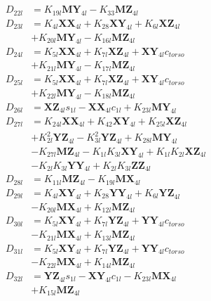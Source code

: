 \begin{align}
 \nonumber \\ 
D_{22l} &= K_{19l}\mathbf{MY}_{4l} - K_{33}\mathbf{MZ}_{4l} \nonumber \\
D_{23l} &= K_{4l}\mathbf{XX}_{4l} + K_{28}\mathbf{XY}_{4l} + K_{6l}\mathbf{XZ}_{4l}  \nonumber \\
&+ K_{20l}\mathbf{MY}_{4l} - K_{16l}\mathbf{MZ}_{4l} \nonumber \\
D_{24l} &= K_{5l}\mathbf{XX}_{4l} + K_{7l}\mathbf{XZ}_{4l} + \mathbf{XY}_{4l}c_{torso}  \nonumber \\
&+ K_{21l}\mathbf{MY}_{4l} - K_{17l}\mathbf{MZ}_{4l} \nonumber \\
D_{25l} &= K_{5l}\mathbf{XX}_{4l} + K_{7l}\mathbf{XZ}_{4l} + \mathbf{XY}_{4l}c_{torso}  \nonumber \\
&+ K_{22l}\mathbf{MY}_{4l} - K_{18l}\mathbf{MZ}_{4l} \nonumber \\
D_{26l} &= \mathbf{XZ}_{4l}s_{1l} - \mathbf{XX}_{4l}c_{1l} + K_{23l}\mathbf{MY}_{4l} \nonumber \\
D_{27l} &= K_{24l}\mathbf{XX}_{4l} + K_{42}\mathbf{XY}_{4l} + K_{25l}\mathbf{XZ}_{4l}  \nonumber \\
&+ K_{2l}^2\mathbf{YZ}_{4l} - K_{3l}^2\mathbf{YZ}_{4l} + K_{28l}\mathbf{MY}_{4l}  \nonumber \\
&- K_{27l}\mathbf{MZ}_{4l} - K_{1l}K_{3l}\mathbf{XY}_{4l} + K_{1l}K_{2l}\mathbf{XZ}_{4l}  \nonumber \\
&- K_{2l}K_{3l}\mathbf{YY}_{4l} + K_{2l}K_{3l}\mathbf{ZZ}_{4l} \nonumber \\
D_{28l} &= K_{11l}\mathbf{MZ}_{4l} - K_{19l}\mathbf{MX}_{4l} \nonumber \\
D_{29l} &= K_{4l}\mathbf{XY}_{4l} + K_{28}\mathbf{YY}_{4l} + K_{6l}\mathbf{YZ}_{4l}  \nonumber \\
&- K_{20l}\mathbf{MX}_{4l} + K_{12l}\mathbf{MZ}_{4l} \nonumber \\
D_{30l} &= K_{5l}\mathbf{XY}_{4l} + K_{7l}\mathbf{YZ}_{4l} + \mathbf{YY}_{4l}c_{torso}  \nonumber \\
&- K_{21l}\mathbf{MX}_{4l} + K_{13l}\mathbf{MZ}_{4l} \nonumber \\
D_{31l} &= K_{5l}\mathbf{XY}_{4l} + K_{7l}\mathbf{YZ}_{4l} + \mathbf{YY}_{4l}c_{torso}  \nonumber \\
&- K_{22l}\mathbf{MX}_{4l} + K_{14l}\mathbf{MZ}_{4l} \nonumber \\
D_{32l} &= \mathbf{YZ}_{4l}s_{1l} - \mathbf{XY}_{4l}c_{1l} - K_{23l}\mathbf{MX}_{4l}  \nonumber \\
&+ K_{15l}\mathbf{MZ}_{4l} \nonumber \\

\end{align}
